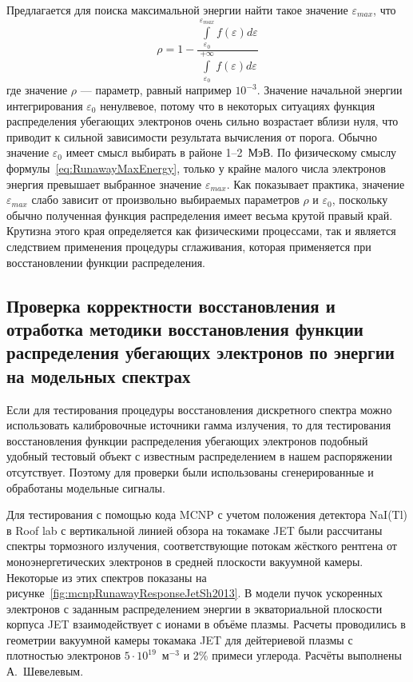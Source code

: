 Предлагается для поиска максимальной энергии найти такое значение $\varepsilon_{max}$, что
\begin{equation}
  \label{eq:RunawayMaxEnergy}
  \rho = 1 - \frac{ \int \limits_{\varepsilon_0}^{\varepsilon_{max}} f(\varepsilon) d\varepsilon }{ \int \limits_{\varepsilon_0}^{+\infty} f(\varepsilon) d\varepsilon }
\end{equation}
где значение $\rho$ --- параметр, равный например $10^{-3}$. Значение начальной энергии интегрирования $\varepsilon_0$ ненулвевое, потому что в некоторых ситуациях функция распределения убегающих электронов очень сильно возрастает вблизи нуля, что приводит к сильной зависимости результата вычисления от порога. Обычно значение $\varepsilon_0$ имеет смысл выбирать в районе 1--2~МэВ. По физическому смыслу формулы~\ref{eq:RunawayMaxEnergy}, только у крайне малого числа электронов энергия превышает выбранное значение $\varepsilon_{max}$. Как показывает практика, значение $\varepsilon_{max}$ слабо зависит от произвольно выбираемых параметров $\rho$ и $\varepsilon_0$, поскольку обычно полученная функция распределения имеет весьма крутой правый край. Крутизна этого края определяется как физическими процессами, так и является следствием применения процедуры сглаживания, которая применяется при восстановлении функции распределения.~\cite{Shevelev2017}


\subsection{ Проверка корректности восстановления и отработка методики восстановления функции распределения убегающих электронов по энергии на модельных спектрах }

Если для тестирования процедуры восстановления дискретного спектра можно использовать калибровочные источники гамма излучения, то для тестирования восстановления функции распределения убегающих электронов подобный удобный тестовый объект с известным распределением в нашем распоряжении отсутствует. Поэтому для проверки были использованы сгенерированные и обработаны модельные сигналы.

Для тестирования с помощью кода MCNP с учетом положения детектора NaI(Tl) в Roof lab с вертикальной линией обзора на токамаке JET были рассчитаны спектры тормозного излучения, соответствующие потокам жёсткого рентгена от моноэнергетических электронов в средней плоскости вакуумной камеры. Некоторые из этих спектров показаны на рисунке~\ref{fig:mcnpRunawayResponseJetSh2013}. В модели пучок ускоренных электронов с заданным распределением энергии в экваториальной плоскости корпуса JET взаимодействует с ионами в объёме плазмы. Расчеты проводились в геометрии вакуумной камеры токамака JET для дейтериевой плазмы с плотностью электронов $ 5 \cdot 10^{19}$~м${}^{-3}$ и 2\% примеси углерода. Расчёты выполнены А.~Шевелевым.~\cite{Shevelev2013} 

